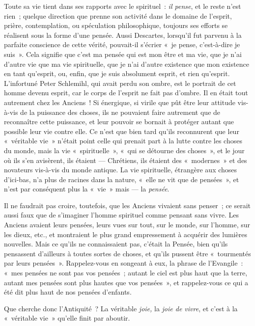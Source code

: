 \documentclass[french,twoside]{book} %
\begin{document}
Toute sa vie tient dans ses rapports avec le spirituel : \emph{il pense}, et le reste n’est rien ; quelque direction que prenne son activité dans le domaine de l’esprit, prière, contemplation, ou spéculation philosophique, toujours ses efforts se réalisent sous la forme d’une pensée. Aussi Descartes, lorsqu’il fut parvenu à la parfaite conscience de cette vérité, pouvait-il s’écrier « je pense, c’est-à-dire je suis ». Cela signifie que c’est ma pensée qui est mon être et ma vie, que je n’ai d’autre vie que ma vie spirituelle, que je n’ai d’autre existence que mon existence en tant qu’esprit, ou, enfin, que je suis absolument esprit, et rien qu’esprit. L’infortuné Peter Schlemihl, qui avait perdu son ombre, est le portrait de cet homme devenu esprit, car le corps de l’esprit ne fait pas d’ombre. Il en était tout autrement chez les Anciens ! Si énergique, si virile que pût être leur attitude vis-à-vis de la puissance des choses, ils ne pouvaient faire autrement que de reconnaître cette puissance, et leur pouvoir se bornait à protéger autant que possible leur vie contre elle.  Ce n’est que bien tard qu’ils reconnurent que leur « véritable vie » n’était point celle qui prenait part à la lutte contre les choses du monde, mais la vie « spirituelle », « qui se détourne des choses », et le jour où ils s’en avisèrent, ils étaient — Chrétiens, ils étaient des « modernes » et des novateurs vis-à-vis du monde antique. La vie spirituelle, étrangère aux choses d’ici-bas, n’a plus de racines dans la nature, « elle ne vit que de pensées », et n’est par conséquent plus la « vie » mais — la \emph{pensée}.\par
Il ne faudrait pas croire, toutefois, que les Anciens vivaient sans penser ; ce serait aussi faux que de s’imaginer l’homme spirituel comme pensant sans vivre. Les Anciens avaient leurs pensées, leurs vues sur tout, sur le monde, sur l’homme, sur les dieux, etc., et montraient le plus grand empressement à acquérir des lumières nouvelles. Mais ce qu’ils ne connaissaient pas, c’était la Pensée, bien qu’ils pensassent d’ailleurs à toutes sortes de choses, et qu’ils pussent être « tourmentés par leurs pensées ». Rappelez-vous en songeant à eux, la phrase de l’Evangile : « mes pensées ne sont pas vos pensées ; autant le ciel est plus haut que la terre, autant mes pensées sont plus hautes que vos pensées », et rappelez-vous ce qui a été dit plus haut de nos pensées d’enfants.\par
Que cherche donc l’Antiquité ? La véritable \emph{joie, }la \emph{joie de vivre}, et c’est à la « véritable vie » qu’elle finit par aboutir.\par
\end{document}
